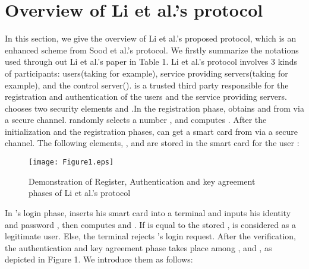 \documentclass[preprint,12pt]{elsarticle}
\begin{document}
\section{Overview of Li et al.'s protocol}
In this section, we give the overview of Li et al.'s proposed protocol, which is an enhanced scheme from Sood et al.'s protocol. We firstly summarize the notations used through out Li et al.'s paper in Table 1. Li et al.'s protocol involves 3 kinds of participants: users(taking  for example), service providing servers(taking  for example), and the control server().  is a trusted third party responsible for the registration and authentication of the users and the service providing servers.  chooses two security elements  and .In the registration phase,  obtains  and  from  via a secure channel.  randomly selects a number , and computes . After the initialization and the registration phases,  can get a smart card from  via a secure channel. The following elements, ,  and  are stored in the smart card for the user :


\begin{figure}[!htb]
\begin{center}
\texttt{[image: Figure1.eps]}
\caption{Demonstration of Register, Authentication and key agreement phases of Li et al.'s protocol }
\end{center}
\end{figure}

In 's login phase,  inserts his smart card into a terminal and inputs his identity  and password , then computes  and . If  is equal to the stored ,  is considered as a legitimate user. Else, the terminal rejects 's login request.  After the verification, the authentication and key agreement phase takes place among ,  and , as depicted in Figure 1. We introduce them as follows:
\end{document}

